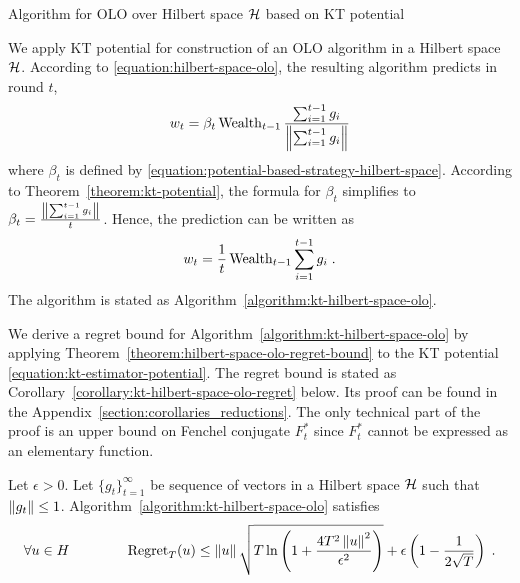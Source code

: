 \begin{algorithm}[t]
\caption{Algorithm for OLO over Hilbert space $\mathcal{H}$ based on KT potential
\label{algorithm:kt-hilbert-space-olo}}
\begin{algorithmic}
{
\ENDFOR
}
\end{algorithmic}
\end{algorithm}

We apply KT potential for construction of an OLO algorithm in a Hilbert
space $\mathcal{H}$. According to \eqref{equation:hilbert-space-olo}, the resulting algorithm predicts
in round $t$,
$$
w_t = \beta_t \operatorname{Wealth}_{t-1} \frac{\sum_{i=1}^{t-1} g_i}{\left\|{\sum_{i=1}^{t-1} g_i}\right\|}
$$
where $\beta_t$ is defined by
\eqref{equation:potential-based-strategy-hilbert-space}. According to
Theorem~\ref{theorem:kt-potential}, the formula for $\beta_t$ simplifies to
$\beta_t = \frac{\left\|{\sum_{i=1}^{t-1} g_i}\right\|}{t}$. Hence, the prediction can be
written as
$$
w_t = \frac{1}{t} \operatorname{Wealth}_{t-1} \sum_{i=1}^{t-1} g_i \; .
$$
The algorithm is stated as Algorithm~\ref{algorithm:kt-hilbert-space-olo}.

We derive a regret bound for Algorithm~\ref{algorithm:kt-hilbert-space-olo} by
applying Theorem~\ref{theorem:hilbert-space-olo-regret-bound} to the KT
potential \eqref{equation:kt-estimator-potential}. The regret bound is stated as
Corollary~\ref{corollary:kt-hilbert-space-olo-regret} below. Its proof can be
found in the Appendix~\ref{section:corollaries_reductions}. The only technical part of the
proof is an upper bound on Fenchel conjugate $F_t^*$ since $F_t^*$ cannot be
expressed as an elementary function.

\begin{corollary}
\label{corollary:kt-hilbert-space-olo-regret}
Let $\epsilon > 0$. Let $\{g_t\}_{t=1}^\infty$ be sequence of vectors in a
Hilbert space $\mathcal{H}$ such that $\left\|{g_t}\right\| \le 1$.
Algorithm~\ref{algorithm:kt-hilbert-space-olo} satisfies
$$
\forall u \in H \qquad \qquad
\operatorname{Regret}_T(u) \le \left\|{u}\right\| \sqrt{T \ln\left(1 + \frac{4T^2 \left\|{u}\right\|^2}{\epsilon^2} \right)} + \epsilon \left(1 - \frac{1}{2\sqrt{T}} \right) \;.
$$
\end{corollary}

